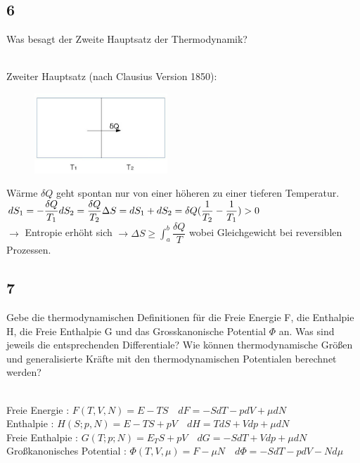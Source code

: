\subsection{6}
\begin{myfrag}
Was besagt der Zweite Hauptsatz der Thermodynamik?
\end{myfrag} \quad \\
Zweiter Hauptsatz (nach Clausius Version 1850): \\[2ex]
\begin{figure}
\includegraphics[width=5cm]{Bilder/Frage6.jpg} 
\end{figure}
Wärme $\delta Q$ geht spontan nur von einer höheren zu einer tieferen Temperatur. \\
$dS_1 = - \dfrac{\delta Q}{T_1} \\
dS_2 = \dfrac{\delta Q}{T_2} \\
\Delta S = dS_1 + dS_2 = \delta Q ( \dfrac{1}{T_2} -\dfrac{1}{T_1}) > 0$ \\
$\rightarrow $ Entropie erhöht sich $\rightarrow  \Delta S \geq \int_a^b \dfrac{\delta Q}{T} $ wobei Gleichgewicht bei reversiblen Prozessen.
\subsection{7}
\begin{myfrag}
Gebe die thermodynamischen Definitionen für die Freie Energie F, die
Enthalpie H, die Freie Enthalpie G und das Grosskanonische Potential $\Phi $
an. Was sind jeweils die entsprechenden Differentiale? Wie können
thermodynamische Größen und generalisierte Kräfte mit den
thermodynamischen Potentialen berechnet werden?
\end{myfrag} \quad \\
Freie Energie : $F(T,V,N) = E-TS \quad dF = -SdT -pdV+\mu dN$ \\
Enthalpie : $ H(S;p,N)=E-TS+pV \quad dH = TdS +Vdp+\mu dN$ \\
Freie Enthalpie : $ G(T;p;N)=E_TS+pV \quad dG=-SdT+Vdp+\mu dN$ \\
Großkanonisches Potential : $\Phi(T,V,\mu ) = F-\mu N \quad d \Phi = -SdT-pdV-Nd \mu $ \\[2ex]

